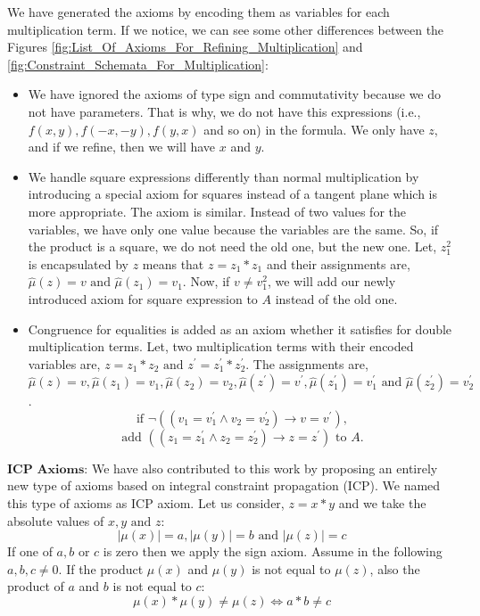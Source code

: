 \noindent We have generated the axioms by encoding them as variables for each multiplication term.
If we notice, we can see some other differences between the Figures \ref{fig:List_Of_Axioms_For_Refining_Multiplication} and \ref{fig:Constraint_Schemata_For_Multiplication}:

\begin{itemize}
    \item We have ignored the axioms of type sign and commutativity because we do not have parameters.
    That is why, we do not have this expressions (i.e., $f(x, y), f(-x, -y), f(y, x)$ and so on) in the formula.
    We only have $z$, and if we refine, then we will have $x$ and $y$.
    \item We handle square expressions differently than normal multiplication by introducing a special axiom for squares instead of a tangent plane which is more appropriate.
    The axiom is similar.
    Instead of two values for the variables, we have only one value because the variables are the same.
    So, if the product is a square, we do not need the old one, but the new one.
    Let, $z_1^2$ is encapsulated by $z$ means that $z = z_1 \ast z_1$ and their assignments are, $\hat{\mu}(z) = v \text{ and } \hat{\mu}(z_1) = v_1$.
    Now, if $v \neq v_1^2$, we will add our newly introduced axiom for square expression to $A$ instead of the old one.
    \item Congruence for equalities is added as an axiom whether it satisfies for double multiplication terms. 
    Let, two multiplication terms with their encoded variables are, $z = z_1 \ast z_2 \text{ and } z^\prime = z_1^\prime \ast z_2^\prime$. 
    The assignments are, $\hat{\mu}(z) = v, \hat{\mu}(z_1) = v_1, \hat{\mu}(z_2) = v_2, \hat{\mu}(z^\prime) = v^\prime, \hat{\mu}(z_1^\prime) = v_1^\prime \text{ and } \hat{\mu}(z_2^\prime) = v_2^\prime$.
    $$\text{if } \neg((v_1 = v_1^\prime \wedge v_2 = v_2^\prime) \to v = v^\prime),$$
    $$\text{add } ((z_1 = z_1^\prime \wedge z_2 = z_2^\prime) \to z = z^\prime) \text{ to } A.$$
\end{itemize}

\noindent $\textbf{ICP Axioms:}$ We have also contributed to this work by proposing an entirely new type of axioms based on integral constraint propagation (ICP).
We named this type of axioms as ICP axiom.
Let us consider, $z = x*y$ and we take the absolute values of $x, y \text{ and } z$:
$$|\mu(x)| = a, |\mu(y)| = b \text{ and } |\mu(z)| = c$$
If one of $a, b$ or $c$ is zero then we apply the sign axiom.
Assume in the following $a, b, c \neq 0$.
If the product $\mu(x)$ and $\mu(y)$ is not equal to $\mu(z)$, also the product of $a$ and $b$ is not equal to $c$:
$$\mu(x) \ast \mu(y) \neq \mu(z) \iff a \ast b \neq c$$

